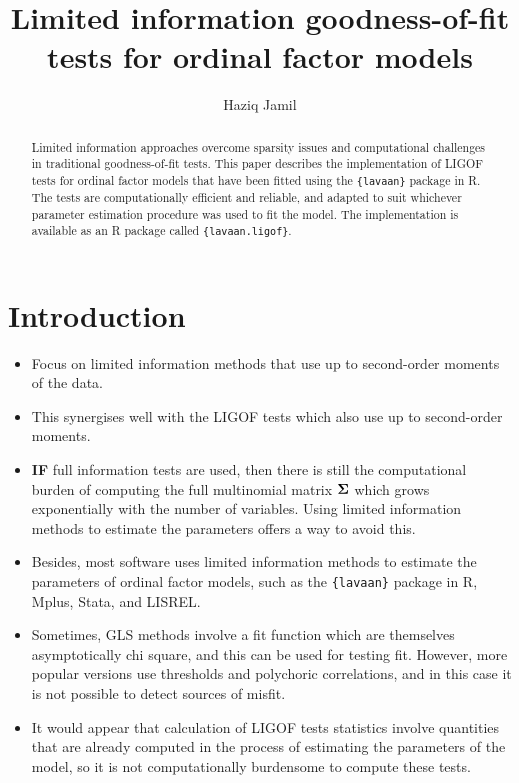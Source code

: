 \documentclass[
  letterpaper,
  DIV=11,
  numbers=noendperiod]{scrartcl}
\title{Limited information goodness-of-fit tests for ordinal factor
models}
\author{Haziq Jamil}
\date{}
\providecommand{\tightlist}{%
  \setlength{\itemsep}{0pt}\setlength{\parskip}{0pt}}
\begin{document}
\maketitle
\begin{abstract}
Limited information approaches overcome sparsity issues and
computational challenges in traditional goodness-of-fit tests. This
paper describes the implementation of LIGOF tests for ordinal factor
models that have been fitted using the \texttt{\{lavaan\}} package in R.
The tests are computationally efficient and reliable, and adapted to
suit whichever parameter estimation procedure was used to fit the model.
The implementation is available as an R package called
\texttt{\{lavaan.ligof\}}.
\end{abstract}


\section{Introduction}\label{introduction}

\begin{itemize}
\tightlist
\item
  Focus on limited information methods that use up to second-order
  moments of the data.
\item
  This synergises well with the LIGOF tests which also use up to
  second-order moments.
\item
  \textbf{IF} full information tests are used, then there is still the
  computational burden of computing the full multinomial matrix
  \({\boldsymbol\Sigma}\) which grows exponentially with the number of variables.
  Using limited information methods to estimate the parameters offers a
  way to avoid this.
\item
  Besides, most software uses limited information methods to estimate
  the parameters of ordinal factor models, such as the
  \texttt{\{lavaan\}} package in R, Mplus, Stata, and LISREL.
\item
  Sometimes, GLS methods involve a fit function which are themselves
  asymptotically chi square, and this can be used for testing fit.
  However, more popular versions use thresholds and polychoric
  correlations, and in this case it is not possible to detect sources of
  misfit.
\item
  It would appear that calculation of LIGOF tests statistics involve
  quantities that are already computed in the process of estimating the
  parameters of the model, so it is not computationally burdensome to
  compute these tests.
\end{itemize}
\end{document}
